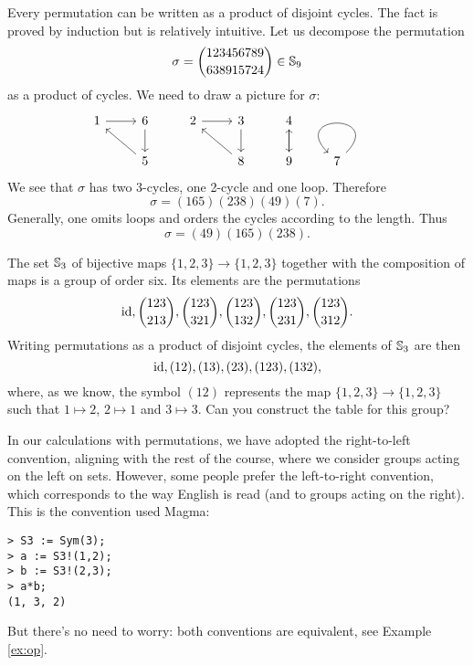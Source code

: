 Every permutation can be written as a product of disjoint cycles. The fact 
is proved by induction but is relatively intuitive. Let us 
decompose the permutation 
\[
\sigma=\binom{123456789}{638915724}\in\mathbb{S}_{9}
\]
as a product of cycles. We need to 
draw a picture for $\sigma$:
\[\begin{tikzcd}
	1 & 6 & 2 & 3 & 4 & \\
	& 5 && 8 & 9 & 7\arrow[loop]        
	\arrow[from=1-1, to=1-2]
	\arrow[from=1-2, to=2-2]
	\arrow[from=2-2, to=1-1]
	\arrow[from=1-3, to=1-4]
	\arrow[from=1-4, to=2-4]
	\arrow[from=2-4, to=1-3]
	\arrow[from=1-5, to=2-5]
	\arrow[from=2-5, to=1-5]
\end{tikzcd}\]
We see that $\sigma$ has two 3-cycles, one 2-cycle
and one loop. 
Therefore 
\[
\sigma=(165)(238)(49)(7).
\]
Generally, 
one omits loops and orders  
the cycles according to 
the length. Thus 
\[
\sigma=(49)(165)(238).
\]

\begin{example}
\label{exa:S3}
The set $\mathbb{S}_3$ of bijective maps $\{1,2,3\}\to\{1,2,3\}$
together with the composition of maps is a group of order six. 
Its elements are the permutations 
        \[
        \operatorname{id},\binom{123}{213},\binom{123}{321},\binom{123}{132},\binom{123}{231},
\binom{123}{312}.
        \]
        Writing 
        permutations as a product of disjoint cycles,  
        the elements of $\mathbb{S}_3$ 
        are then         
        \[
                \operatorname{id},(12),(13),(23),(123),(132),
        \]
        where, as we know, the symbol $(12)$ represents 
        the map $\{1,2,3\}\to\{1,2,3\}$ such that 
        $1\mapsto 2$, $2\mapsto 1$ and $3\mapsto 3$. 
        Can you construct the table for this group? 
\end{example}

\label{convention:left-to-right}
In our calculations with permutations, we have adopted the right-to-left convention, aligning with the rest of the course, where we consider groups acting on the left on sets. However, some people prefer the left-to-right convention, which corresponds to the way English is read (and to groups acting on the right). This is the convention used Magma:
\begin{lstlisting}
> S3 := Sym(3);
> a := S3!(1,2);
> b := S3!(2,3);
> a*b;
(1, 3, 2)
\end{lstlisting}
But there’s no need to worry: both conventions are equivalent, see Example \ref{ex:op}. 

